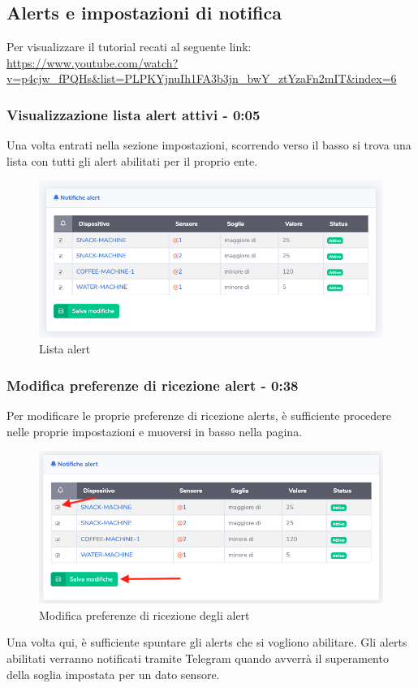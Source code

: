 \subsection{Alerts e impostazioni di notifica}
Per visualizzare il tutorial recati al seguente link: 
\url{https://www.youtube.com/watch?v=p4cjw_fPQHs&list=PLPKYjnuIh1FA3b3jn_bwY_ztYzaFn2mIT&index=6}

	\subsubsection{Visualizzazione lista alert attivi - 0:05}

		Una volta entrati nella sezione impostazioni, scorrendo verso il basso si trova una lista con tutti gli alert abilitati per il proprio ente.
		\begin{figure}[H]
		\centering
		\includegraphics[scale=0.600]{res/images/membro/listaAlert.png}
		\caption{Lista alert}
	\end{figure}

	\subsubsection{Modifica preferenze di ricezione alert - 0:38}
		Per modificare le proprie preferenze di ricezione alerts, è sufficiente procedere nelle proprie impostazioni e muoversi in basso nella pagina.
		\begin{figure}[H]
		\centering
		\includegraphics[scale=0.600]{res/images/membro/attDisattAlert.png}
		\caption{Modifica preferenze di ricezione degli alert}
	\end{figure}
		Una volta qui, è sufficiente spuntare gli alerts che si vogliono abilitare. Gli alerts abilitati verranno notificati tramite Telegram quando avverrà il superamento della soglia impostata per un dato sensore.


